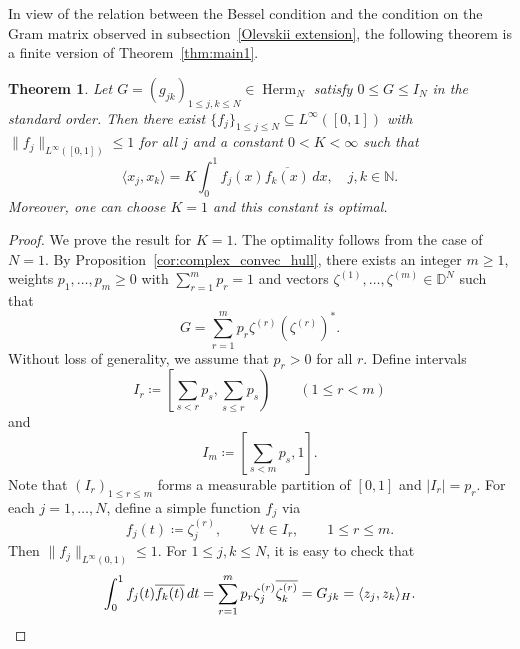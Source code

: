\documentclass[reqno,a4paper,12pt]{amsart}
\numberwithin{equation}{section}
\newtheorem{theorem}[definition]{Theorem}
\def\N{{\mathbb N}}
\def\D{{\mathbb D}}
\newcommand\1{\mathds{1}}
\DeclareMathOperator{\herm}{Herm}
\begin{document}
In view of the relation between the Bessel condition and the condition on the Gram matrix observed in subsection~\ref{Olevskii extension}, the following theorem is a finite version of Theorem~\ref{thm:main1}.
\begin{theorem}\label{thm:main1:finite}
    Let $G=(g_{jk})_{1\le j,k\le N} \in \herm_N$ satisfy $0\leq G\leq I_N$ in the standard order. Then there exist $\{ f_j \}_{1\leq j\leq N} \subseteq L^\infty([0,1])$ with $\| f_j \|_{L^\infty([0,1])} \leq 1$ for all $j$ and a constant $0 <K< \infty$ such that
    \begin{equation}
        \langle x_j,x_k \rangle = K \int_0^1 f_j(x) \overline{f_k(x)} \, dx, \quad j,k \in \N.
    \end{equation}
    Moreover, one can choose $K=1$ and this constant is optimal.
\end{theorem}
\begin{proof}
    We prove the result for $K=1$. The optimality follows from the case of $N=1$. By Proposition~\ref{cor:complex_convec_hull}, there exists an integer $m\ge 1$, weights $p_1,\dots,p_m\ge 0$ with $\sum_{r=1}^m p_r=1$ and vectors $\zeta^{(1)},\ldots,\zeta^{(m)}\in \D^{N}$ such that
    \begin{equation*}
    G
    =
    \sum_{r=1}^m p_r \zeta^{(r)}(\zeta^{(r)})^*.
    \end{equation*}
    Without loss of generality, we assume that $p_r>0$ for all $r$. Define intervals
    \begin{equation*}
    I_r\coloneqq
    \left[\sum_{s<r}p_s,\sum_{s\le r}p_s\right)
    \qquad
    (1\le r<m)
    \end{equation*}
    and
    \begin{equation*}
    I_m\coloneqq
    \left[\sum_{s<m}p_s,1\right].
    \end{equation*}
    Note that $(I_r)_{1\le r\le m}$ forms a measurable partition of $[0,1]$ and $|I_r|=p_r$. For each $j=1,\dots,N$, define a simple function $f_j$ via
    \begin{equation}\label{fct}
    f_j(t)\coloneqq\zeta_j^{(r)},
    \qquad
    \forall t\in I_r, 
    \qquad
    1\le r\le m.
    \end{equation}
    Then $\|f_j\|_{L^\infty(0,1)}\le 1$. For $1\le j,k\le N$, it is easy to check that
    \begin{equation*}
    \int_0^1 f_j(t)\overline{f_k(t)}\,dt
    =
    \sum_{r=1}^m p_r
    \zeta_j^{(r)}\overline{\zeta_k^{(r)}}
    =
    G_{jk}
    =
    \langle z_j,z_k\rangle_H.\qedhere
    \end{equation*}
\end{proof}
\end{document}
